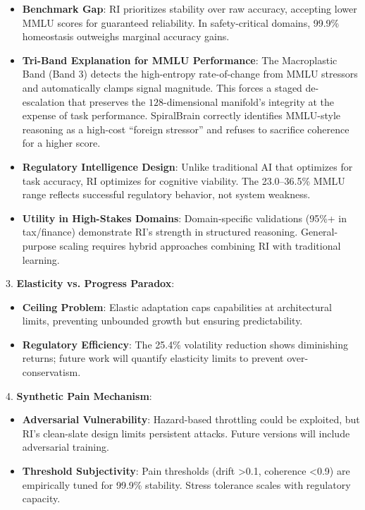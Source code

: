 \documentclass[12pt,a4paper]{report}
\begin{document}
\begin{itemize}
    \item \textbf{Benchmark Gap}: RI prioritizes stability over raw accuracy, accepting lower MMLU scores for guaranteed reliability. In safety-critical domains, 99.9\% homeostasis outweighs marginal accuracy gains.

    \item \textbf{Tri-Band Explanation for MMLU Performance}: The Macroplastic Band (Band 3) detects the high-entropy rate-of-change from MMLU stressors and automatically clamps signal magnitude. This forces a staged de-escalation that preserves the $128$-dimensional manifold's integrity at the expense of task performance. SpiralBrain correctly identifies MMLU-style reasoning as a high-cost ``foreign stressor'' and refuses to sacrifice coherence for a higher score.

    \item \textbf{Regulatory Intelligence Design}: Unlike traditional AI that optimizes for task accuracy, RI optimizes for cognitive viability. The 23.0--36.5\% MMLU range reflects successful regulatory behavior, not system weakness.

    \item \textbf{Utility in High-Stakes Domains}: Domain-specific validations (95\%+ in tax/finance) demonstrate RI's strength in structured reasoning. General-purpose scaling requires hybrid approaches combining RI with traditional learning.
\end{itemize}

3. \textbf{Elasticity vs. Progress Paradox}:

\begin{itemize}
    \item \textbf{Ceiling Problem}: Elastic adaptation caps capabilities at architectural limits, preventing unbounded growth but ensuring predictability.
    
   \item \textbf{Regulatory Efficiency}: The 25.4\% volatility reduction shows diminishing returns; future work will quantify elasticity limits to prevent over-conservatism.
\end{itemize}


4. \textbf{Synthetic Pain Mechanism}:
\begin{itemize}
   \item\textbf{Adversarial Vulnerability}: Hazard-based throttling could be exploited, but RI's clean-slate design limits persistent attacks. Future versions will include adversarial training.
   
   \item\textbf{Threshold Subjectivity}: Pain thresholds (drift >0.1, coherence <0.9) are empirically tuned for 99.9\% stability. Stress tolerance scales with regulatory capacity.
\end{itemize}
\end{document}
